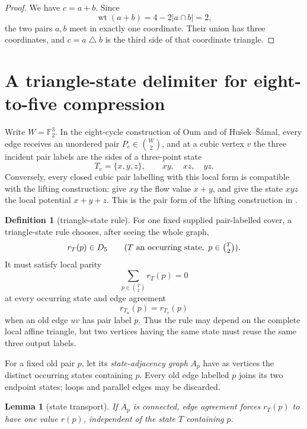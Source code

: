 \documentclass[11pt]{article}
\newtheorem{lemma}[theorem]{Lemma}
\theoremstyle{definition}
\newtheorem{definition}[theorem]{Definition}
\theoremstyle{remark}
\newcommand{\F}{\mathbb F}
\newcommand{\symdiff}{\mathbin{\triangle}}
\newcommand{\wt}{\operatorname{wt}}
\begin{document}
\begin{proof}
We have \(c=a+b\).  Since
\[
 \wt(a+b)=4-2|a\cap b|=2,
\]
the two pairs \(a,b\) meet in exactly one coordinate.  Their union has
three coordinates, and \(c=a\symdiff b\) is the third side of that
coordinate triangle.
\end{proof}

\section{A triangle-state delimiter for eight-to-five compression}

Write \(W=\F_2^3\).  In the eight-cycle construction of Oum and of
Hu\v{s}ek--\v{S}\'amal, every edge receives an unordered pair
\(P_e\in\binom W2\), and at a cubic vertex \(v\) the three incident pair
labels are the sides of a three-point state
\[
             T_v=\{x,y,z\},\qquad xy,\quad xz,\quad yz.       \tag{C1}
\]
Conversely, every closed cubic pair labelling with this local form is
compatible with the lifting construction: give \(xy\) the flow value
\(x+y\), and give the state \(xyz\) the local potential \(x+y+z\).
This is the pair form of the lifting construction in
\cite{Oum2026,HusekSamal2026}.

\begin{definition}[triangle-state rule]
For one fixed supplied pair-labelled cover, a triangle-state rule chooses,
after seeing the whole graph,
\[
 r_T(p)\in D_5\qquad
 (T\text{ an occurring state},\ p\in\tbinom T2).
\]
It must satisfy local parity
\[
                       \sum_{p\in\binom T2}r_T(p)=0           \tag{C2}
\]
at every occurring state and edge agreement
\[
                         r_{T_u}(p)=r_{T_v}(p)                \tag{C3}
\]
when an old edge \(uv\) has pair label \(p\).  Thus the rule may depend on
the complete local affine triangle, but two vertices having the same state
must reuse the same three output labels.
\end{definition}

For a fixed old pair \(p\), let its \emph{state-adjacency graph} \(A_p\)
have as vertices the distinct occurring states containing \(p\).  Every
old edge labelled \(p\) joins its two endpoint states; loops and parallel
edges may be discarded.

\begin{lemma}[state transport]\label{lem:state-transport}
If \(A_p\) is connected, edge agreement forces \(r_T(p)\) to have one
value \(r(p)\), independent of the state \(T\) containing \(p\).
\end{lemma}
\end{document}
